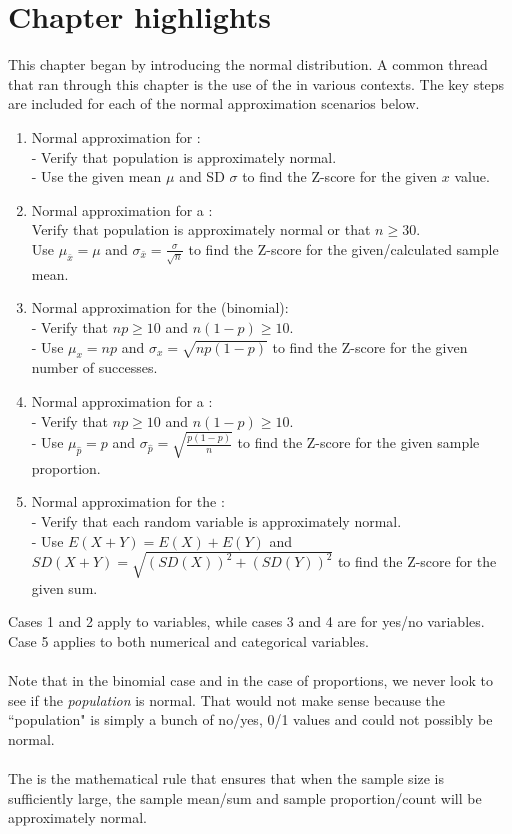 \section{Chapter highlights}

\noindent This chapter began by introducing the normal distribution.  A common thread that ran through this chapter is the use of the  in various contexts.  
The key steps are included for each of the normal approximation scenarios below.

\begin{enumerate}
\item Normal approximation for :  
\\- Verify that population is approximately normal.
\\- Use the given mean $\mu$ and SD $\sigma$ to find the Z-score for the given $x$ value.
\item Normal approximation for a :  
\\Verify that population is approximately normal or that $n\ge 30$.
\\Use $\mu_{\bar{x}}=\mu$ and $\sigma_{\bar{x}}=\frac{\sigma}{\sqrt{n}}$ to find the Z-score for the given/calculated sample mean.
\item Normal approximation for the  (binomial):  
\\- Verify that $np\ge 10$ and $n(1-p)\ge 10$.
\\- Use $\mu_x = np$ and $\sigma_x = \sqrt{np(1-p)}$ to find the Z-score for the given number of successes.  
\item Normal approximation for a :  
\\- Verify that $np\ge 10$ and $n(1-p)\ge 10$.
\\- Use $\mu_{\hat{p}} = p$ and $\sigma_{\hat{p}} = \sqrt{\frac{p(1-p)}{n}}$ to find the Z-score for the given sample proportion.
\item Normal approximation for the :
\\- Verify that each random variable is approximately normal.
\\- Use $E(X+Y)=E(X)+E(Y)$ and $SD(X+Y)=\sqrt{(SD(X))^2+(SD(Y))^2}$ to find the Z-score for the given sum.
\end{enumerate}
Cases 1 and 2 apply to  variables, while cases 3 and 4 are for  yes/no variables.  Case 5 applies to both numerical and categorical variables.
\\
\\Note that in the binomial case and in the case of proportions, we never look to see if the \emph{population} is normal.  That would not make sense because the ``population" is simply a bunch of no/yes, 0/1 values and could not possibly be normal.
\\
\\The {} is the mathematical rule that ensures that when the sample size is sufficiently large, the sample mean/sum and sample proportion/count will be approximately normal.  

